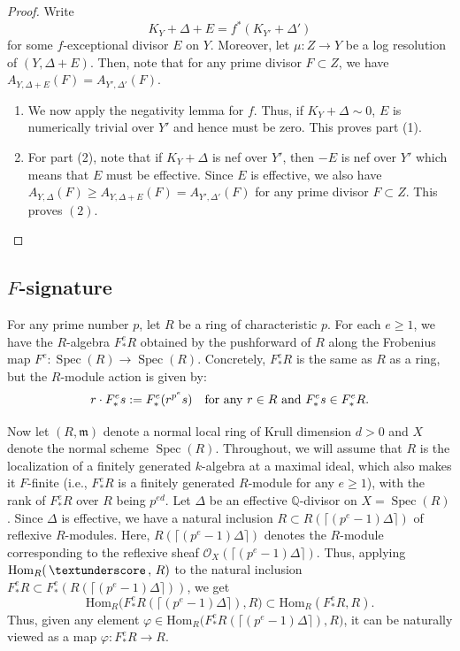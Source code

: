 \documentclass[11pt,reqno]{amsart}
\newcommand{\Q}{\mathbb{Q}}
\newcommand{\cO}{\mathcal{O}}
\newcommand{\fm}{\mathfrak{m}}
\DeclareMathOperator{\Spec}{Spec}
\newcommand{\Hom}{\mathrm{Hom}}
\newcommand{\Fe}{F_* ^e}
\numberwithin{equation}{section}
\theoremstyle{definition}
\begin{document}
\begin{proof}
    Write
    \begin{equation} \label{restrictiontoU}
        K_Y + \Delta + E = f^* (K_{Y'} + \Delta') 
    \end{equation}
    for some $f$-exceptional divisor $E$ on $Y$. Moreover, let $\mu: Z \to Y$ be a log resolution of $(Y, \Delta + E)$. Then, note that for any prime divisor $F \subset Z$, we have $A_{Y, \Delta +E} (F) = A_{Y', \Delta'} (F)$. 
    
    \begin{enumerate}
        \item We now apply the negativity lemma for $f$. Thus, if $K_Y + \Delta \sim 0$, $E$ is numerically trivial over $Y'$ and hence must be zero. This proves part (1).

        \item  For part (2), note that if $K_Y + \Delta $ is nef over $Y'$, then $-E$ is nef over $Y'$ which means that $E$ must be effective. Since $E$ is effective, we also have $A_{Y, \Delta} (F) \geq A_{Y, \Delta + E} (F) = A_{Y', \Delta'} (F)$ for any prime divisor $F \subset Z$. This proves $(2)$. \qedhere
    \end{enumerate}
\end{proof}



\subsection{$F$-signature}
	
 For any prime number $p$, let $R$ be a ring of characteristic $p$. For each $e \geq 1$, we have the $R$-algebra $\Fe R$ obtained by the pushforward of $R$ along the Frobenius map $F^e: \Spec(R) \to \Spec(R)$. Concretely, $F_{*} ^e R$ is the same as $R$ as a ring, but the $R$-module action is given by:
 $$ r\cdot F_* ^e s := F_{*} ^e (r^{p^e} s) \textrm{\quad for any $r\in R$ and $F_* ^e s \in F_* ^e R$}   .$$

 
 	Now let $(R, \fm)$ denote a normal local ring of Krull dimension $d>0$ and $X$ denote the normal scheme $\Spec(R)$. Throughout, we will assume that $R$ is the localization of a finitely generated $k$-algebra at a maximal ideal,  which also makes it  $F$-finite (i.e., $F_{*} ^e R$ is a finitely generated $R$-module for any $e \geq 1$), with the rank of $\Fe R $ over $R$ being $p^{ed}$. Let $\Delta$ be an effective $\Q$-divisor on $X = \Spec(R)$. Since $\Delta$ is effective, we have a natural inclusion $R \subset R( \lceil (p^e -1) \Delta \rceil)$ of reflexive $R$-modules. Here, $R(\lceil (p^e -1) \Delta \rceil) $ denotes the $R$-module corresponding to the reflexive sheaf $\cO_X (\lceil (p^e -1) \Delta \rceil)$. Thus, applying $\Hom_R ( \, \textunderscore \, , \, R)$ to the natural inclusion $\Fe R \subset \Fe (R(\lceil (p^e -1) \Delta \rceil))
  $, we get
  \[   \Hom_R \big( \Fe R(\lceil (p^e -1) \Delta \rceil), R \big) \subset \Hom _R (\Fe R, R).  \]
Thus, given any element  $\varphi \in \Hom_R \big( \Fe R(\lceil (p^e -1) \Delta \rceil), R \big) $, it can be naturally viewed as a map $\varphi: \Fe R \to R$.
 	
\end{document}
